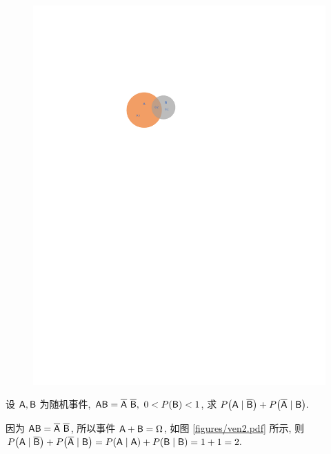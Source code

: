 \begin{minipage}[b]{0.3\linewidth}
    \begin{figure}[H]
        \centering
        \includegraphics[scale=0.8]{figures/ven3.pdf}
        \caption{}
        \label{figures/ven3.pdf}
    \end{figure}
\end{minipage}

\begin{example}
    设 $\mathsf{A},\mathsf{B}$ 为随机事件, $\mathsf{AB}=\overline{\mathsf{A}}~\overline{\mathsf{B}},~0<P(\mathsf{B})<1$, 求 $P\qty(\mathsf{A}\mid\overline{\mathsf{B}})+P\qty(\overline{\mathsf{A}}\mid\mathsf{B}).$
\end{example}
\begin{solution}
    因为 $\mathsf{AB}=\overline{\mathsf{A}}~\overline{\mathsf{B}}$, 所以事件 $\mathsf{A}+\mathsf{B}=\Omega$, 如图 \ref{figures/ven2.pdf} 所示, 
    则 $P\qty(\mathsf{A}\mid\overline{\mathsf{B}})+P\qty(\overline{\mathsf{A}}\mid\mathsf{B})=P(\mathsf{A}\mid\mathsf{A})+P(\mathsf{B}\mid\mathsf{B})=1+1=2.$
\end{solution}

